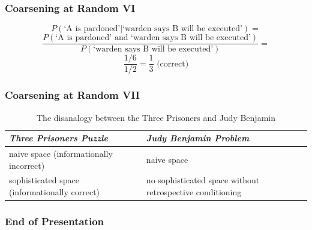 \documentclass[xcolor=dvipsnames]{beamer}
\begin{document}
\begin{frame}
  \frametitle{Coarsening at Random VI}
\begin{displaymath}
  P(\mbox{`A is pardoned'}|\mbox{`warden says B will be
    executed'})=
\end{displaymath}
\begin{displaymath}
  \frac{P(\mbox{`A is pardoned' and `warden says B will
      be executed'})}{P(\mbox{`warden says B will be
      executed'})}=
\end{displaymath}
\begin{displaymath}
  \frac{1/6}{1/2}=\frac{1}{3}\mbox{ (correct)}
\end{displaymath}
\end{frame}

\renewcommand{\arraystretch}{4}
\begin{frame}
  \frametitle{Coarsening at Random VII}
  \begin{table}
    \centering
    \begin{tabular}{|l|l|}\hline
    \rowcolor{myblue} \emph{Three Prisoners Puzzle} & \emph{Judy Benjamin Problem} \\ \hline
\parbox{3.5cm}{\raggedright naive space (informationally incorrect)} & \parbox{3.5cm}{\raggedright naive space} \\ \hline
\parbox{3.5cm}{\raggedright sophisticated space (informationally correct)} & \parbox{3.5cm}{\raggedright no sophisticated space without retrospective conditioning} \\ \hline
  \end{tabular}
    \caption{The disanalogy between the Three Prisoners and Judy Benjamin}
  \end{table}
\end{frame}

\begin{frame}
  \frametitle{End of Presentation}
\end{frame}
\end{document}
